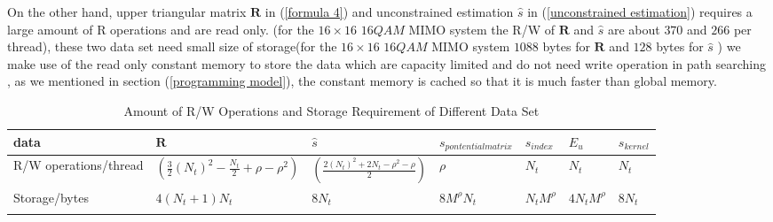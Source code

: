 \documentclass[12pt,a4paper,final]{article}
\begin{document}
\begin{spacing}{2.5}
  On the other hand,   upper triangular matrix $\mathbf{R}$ in (\ref{formula 4})  and unconstrained estimation $\hat{s}$ in (\ref{unconstrained estimation})  requires a large amount of R operations and are read only. (for the $16\times 16$ $16QAM$ MIMO system the R/W of $\mathbf{R}$  and $\hat{s}$ are about  $370$ and $266$ per thread), these two data set need small size of storage(for the $16\times 16$ $16QAM$ MIMO system $1088$ bytes for $\mathbf{R}$ and $128$ bytes for $\hat{s}$  ) we make use of the read only constant memory to store the data which are capacity limited and do not need write operation in path searching , as we mentioned in section (\ref{programming model}), the constant memory is cached so that it is much faster than global memory.
 \begin{table}[htb]  
 \caption{Amount of R/W Operations and Storage Requirement of Different Data Set}
 \centering
\begin{tabular}{|p{3cm}|p{3cm}|l|p{3cm}|l|l|l|}
\hline
data & $\mathbf{R}$ & $\hat{s}$ & $\mathit{s_{pontential matrix}}$ & $\mathit{s_{index}}$ & $\mathit{E_{u}}$ & $\mathit{s_{kernel}}$ \\
\hline
R/W operations/thread & $(\frac{3}{2}(N_{t})^{2}-\frac{N_{t}}{2}+\rho-\rho^{2})$ & $(\frac{2(N_{t})^{2}+2N_{t}-\rho^{2}-\rho}{2})$ & $\rho$ & $N_{t}$ &$N_{t} $ & $N_{t}$ \\
\hline
Storage/bytes  & $4(N_{t}+1)N_{t}$ & $8N_{t}$ & $8M^{\rho}N_{t}$ & $N_{t}M^{\rho}$ & $4N_{t}M^{\rho}$ & $8N_{t}$\\
\hline  \label{amount of R/W operation} 
\end{tabular} 
\end{table} 

\end{spacing}
\end{document}

